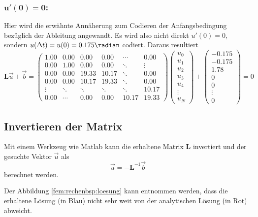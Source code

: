 \subsubsection{$\mathbf{u'(0) = 0 }$:}
Hier wird die erwähnte Annäherung zum Codieren der Anfangsbedingung bezüglich der Ableitung angewandt.
Es wird also nicht direkt $u'(0) = 0 $, sondern $u(\Delta t) = u(0) = 0.175 \radian$ codiert.
Daraus resultiert
\begin{equation}
    \mathbf{L}\vec{u} + \vec{b} 
    = \left(\begin{matrix}
         1.00  &  0.00  &  0.00  &  0.00  & \cdots &  0.00  \\
         0.00  &  1.00  &  0.00  &  0.00  & \ddots & \vdots \\
         0.00  &  0.00  & 19.33  & 10.17  & \ddots &  0.00  \\
         0.00  &  0.00  & 10.17  & 19.33  & \ddots &  0.00  \\
        \vdots & \ddots & \ddots & \ddots & \ddots & 10.17  \\
         0.00  & \cdots & 0.00   &  0.00  & 10.17  & 19.33
    \end{matrix}\right)
    \left(\begin{matrix}
        u_0 \\ u_1 \\ u_2 \\ u_3 \\ u_4 \\ \vdots \\ u_N
    \end{matrix}\right)
    +
    \left(\begin{matrix}
        -0.175 \\ -0.175 \\ 1.78 \\ 0 \\ 0 \\ \vdots \\ 0
    \end{matrix}\right)
    = 0
\end{equation}


\subsection{Invertieren der Matrix}
Mit einem Werkzeug wie Matlab kann die erhaltene Matrix $\mathbf{L}$ invertiert und der gesuchte Vektor $\vec{u}$ als 
\begin{equation}
    \vec{u} = - \mathbf{L}^{-1} \vec{b}
\end{equation}
berechnet werden.

Der Abbildung \ref{fem:rechenbsp:loesung} kann entnommen werden, dass die erhaltene Lösung (in Blau) nicht sehr weit von der analytischen Lösung (in Rot) abweicht.